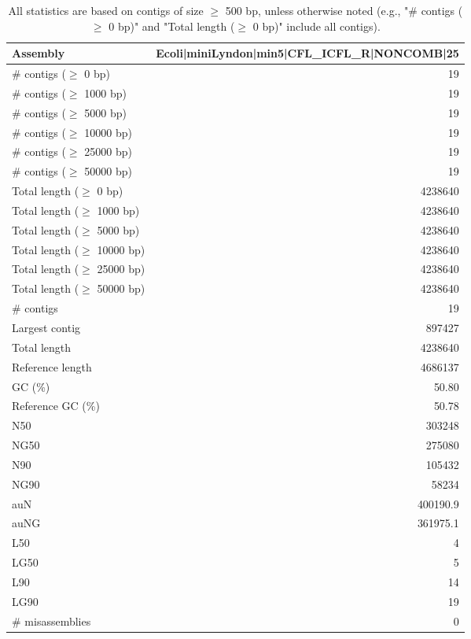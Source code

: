 \documentclass[12pt,a4paper]{article}
\begin{document}
\begin{table}[ht]
\begin{center}
\caption{All statistics are based on contigs of size $\geq$ 500 bp, unless otherwise noted (e.g., "\# contigs ($\geq$ 0 bp)" and "Total length ($\geq$ 0 bp)" include all contigs).}
\begin{tabular}{|l*{1}{|r}|}
\hline
Assembly & Ecoli|miniLyndon|min5|CFL\_ICFL\_R|NONCOMB|25 \\ \hline
\# contigs ($\geq$ 0 bp) & 19 \\ \hline
\# contigs ($\geq$ 1000 bp) & 19 \\ \hline
\# contigs ($\geq$ 5000 bp) & 19 \\ \hline
\# contigs ($\geq$ 10000 bp) & 19 \\ \hline
\# contigs ($\geq$ 25000 bp) & 19 \\ \hline
\# contigs ($\geq$ 50000 bp) & 19 \\ \hline
Total length ($\geq$ 0 bp) & 4238640 \\ \hline
Total length ($\geq$ 1000 bp) & 4238640 \\ \hline
Total length ($\geq$ 5000 bp) & 4238640 \\ \hline
Total length ($\geq$ 10000 bp) & 4238640 \\ \hline
Total length ($\geq$ 25000 bp) & 4238640 \\ \hline
Total length ($\geq$ 50000 bp) & 4238640 \\ \hline
\# contigs & 19 \\ \hline
Largest contig & 897427 \\ \hline
Total length & 4238640 \\ \hline
Reference length & 4686137 \\ \hline
GC (\%) & 50.80 \\ \hline
Reference GC (\%) & 50.78 \\ \hline
N50 & 303248 \\ \hline
NG50 & 275080 \\ \hline
N90 & 105432 \\ \hline
NG90 & 58234 \\ \hline
auN & 400190.9 \\ \hline
auNG & 361975.1 \\ \hline
L50 & 4 \\ \hline
LG50 & 5 \\ \hline
L90 & 14 \\ \hline
LG90 & 19 \\ \hline
\# misassemblies & 0 \\ \hline

\end{tabular}
\end{center}
\end{table}
\end{document}
